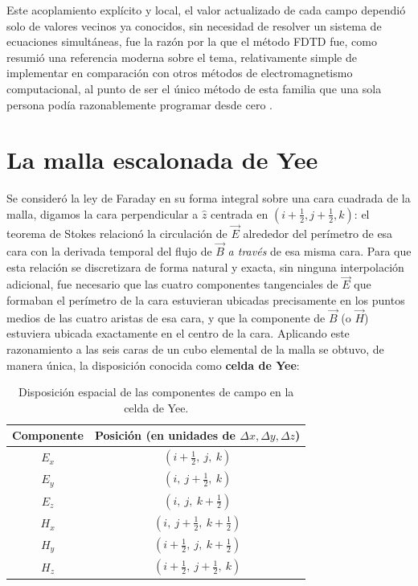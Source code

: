 Este acoplamiento explícito y local, el valor actualizado de cada campo dependió solo de valores vecinos ya conocidos, sin necesidad de resolver un sistema de ecuaciones simultáneas, fue la razón por la que el método FDTD fue, como resumió una referencia moderna sobre el tema, relativamente simple de implementar en comparación con otros métodos de electromagnetismo computacional, al punto de ser el único método de esta familia que una sola persona podía razonablemente programar desde cero \cite{Schneider2025}.

\section{La malla escalonada de Yee}
Se consideró la ley de Faraday en su forma integral sobre una cara cuadrada de la malla, digamos la cara perpendicular a $\hat{z}$ centrada en $(i+\frac{1}{2}, j+\frac{1}{2}, k)$: el teorema de Stokes relacionó la circulación de $\vec{E}$ alrededor del perímetro de esa cara con la derivada temporal del flujo de $\vec{B}$ \textit{a través} de esa misma cara. Para que esta relación se discretizara de forma natural y exacta, sin ninguna interpolación adicional, fue necesario que las cuatro componentes tangenciales de $\vec{E}$ que formaban el perímetro de la cara estuvieran ubicadas precisamente en los puntos medios de las cuatro aristas de esa cara, y que la componente de $\vec{B}$ (o $\vec{H}$) estuviera ubicada exactamente en el centro de la cara. Aplicando este razonamiento a las seis caras de un cubo elemental de la malla se obtuvo, de manera única, la disposición conocida como \textbf{celda de Yee}:

\begin{table}[htbp]
    \centering
    \renewcommand{\arraystretch}{1.5}
    \begin{tabular}{cc}
        \hline
        \textbf{Componente} & \textbf{Posición (en unidades de $\Delta x, \Delta y, \Delta z$)} \\
        \hline
        $E_x$ & $(i+\frac{1}{2}, \ j, \ k)$ \\
        $E_y$ & $(i, \ j+\frac{1}{2}, \ k)$ \\
        $E_z$ & $(i, \ j, \ k+\frac{1}{2})$ \\
        $H_x$ & $(i, \ j+\frac{1}{2}, \ k+\frac{1}{2})$ \\
        $H_y$ & $(i+\frac{1}{2}, \ j, \ k+\frac{1}{2})$ \\
        $H_z$ & $(i+\frac{1}{2}, \ j+\frac{1}{2}, \ k)$ \\
        \hline
    \end{tabular}
    \caption{Disposición espacial de las componentes de campo en la celda de Yee.}
    \label{tab:celda_yee}
\end{table}

